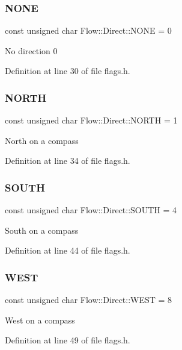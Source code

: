 \hypertarget{namespace_flow_1_1_direct_a3a2e55bf055fca941f5bd430389462ea}{}\label{namespace_flow_1_1_direct_a3a2e55bf055fca941f5bd430389462ea} 
\subsubsection{\texorpdfstring{N\+O\+NE}{NONE}}
{\footnotesize\ttfamily const unsigned char Flow\+::\+Direct\+::\+N\+O\+NE = 0}

No direction 0 

Definition at line 30 of file flags.\+h.

\hypertarget{namespace_flow_1_1_direct_aeaeaa2d58de609af52cf2666bf3868a7}{}\label{namespace_flow_1_1_direct_aeaeaa2d58de609af52cf2666bf3868a7} 
\subsubsection{\texorpdfstring{N\+O\+R\+TH}{NORTH}}
{\footnotesize\ttfamily const unsigned char Flow\+::\+Direct\+::\+N\+O\+R\+TH = 1}

North on a compass 

Definition at line 34 of file flags.\+h.

\hypertarget{namespace_flow_1_1_direct_ac93371fec14643176c2413f84b02b9ad}{}\label{namespace_flow_1_1_direct_ac93371fec14643176c2413f84b02b9ad} 
\subsubsection{\texorpdfstring{S\+O\+U\+TH}{SOUTH}}
{\footnotesize\ttfamily const unsigned char Flow\+::\+Direct\+::\+S\+O\+U\+TH = 4}

South on a compass 

Definition at line 44 of file flags.\+h.

\hypertarget{namespace_flow_1_1_direct_a71884fb1eefd6b366b08e03e8eca5205}{}\label{namespace_flow_1_1_direct_a71884fb1eefd6b366b08e03e8eca5205} 
\subsubsection{\texorpdfstring{W\+E\+ST}{WEST}}
{\footnotesize\ttfamily const unsigned char Flow\+::\+Direct\+::\+W\+E\+ST = 8}

West on a compass 

Definition at line 49 of file flags.\+h.

